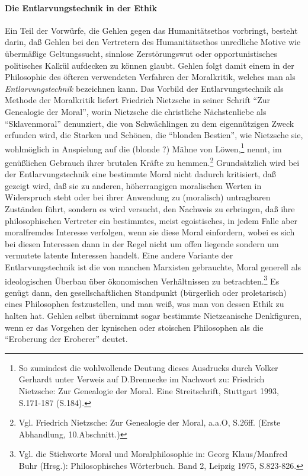 \documentclass[12pt,a4paper]{article}
\begin{document}
\paragraph{Die Entlarvungstechnik in der Ethik} Ein Teil der Vorwürfe, die
Gehlen gegen das Humanitätsethos vorbringt, besteht darin, daß Gehlen bei den
Vertretern des Humanitätsethos unredliche Motive wie übermäßige Geltungssucht,
sinnlose Zerstörungswut oder opportunistisches politisches Kalkül aufdecken zu
können glaubt. Gehlen folgt damit einem in der Philosophie des öfteren
verwendeten Verfahren der Moralkritik, welches man als {\em
  Entlarvungstechnik} bezeichnen kann. Das Vorbild der Entlarvungstechnik als
Methode der Moralkritik liefert Friedrich Nietzsche in seiner Schrift "`Zur
Genealogie der Moral"', worin Nietzsche die christliche Nächstenliebe als
"`Sklavenmoral"' denunziert, die von Schwächlingen zu dem eigennützigen Zweck
erfunden wird, die Starken und Schönen, die "`blonden Bestien"', wie Nietzsche
sie, wohlmöglich in Anspielung auf die (blonde ?) Mähne von Löwen,\footnote{So
  zumindest die wohlwollende Deutung dieses Ausdrucks durch Volker Gerhardt
  unter Verweis auf D.Brennecke im Nachwort zu: Friedrich Nietzsche: Zur
  Genealogie der Moral. Eine Streitschrift, Stuttgart 1993, S.171-187
  (S.184).} nennt, im genüßlichen Gebrauch ihrer brutalen Kräfte zu
hemmen.\footnote{Vgl. Friedrich Nietzsche: Zur Genealogie der Moral, a.a.O,
  S.26ff. (Erste Abhandlung, 10.Abschnitt.)}  Grundsätzlich wird bei der
Entlarvungstechnik eine bestimmte Moral nicht dadurch kritisiert, daß gezeigt
wird, daß sie zu anderen, höherrangigen moralischen Werten in Widerspruch
steht oder bei ihrer Anwendung zu (moralisch) untragbaren Zuständen führt,
sondern es wird versucht, den Nachweis zu erbringen, daß ihre philosophischen
Vertreter ein bestimmtes, meist egoistisches, in jedem Falle aber moralfremdes
Interesse verfolgen, wenn sie diese Moral einfordern, wobei es sich bei diesen
Interessen dann in der Regel nicht um offen liegende sondern um vermutete
latente Interessen handelt. Eine andere Variante der Entlarvungstechnik ist
die von manchen Marxisten gebrauchte, Moral generell als ideologischen Überbau
über ökonomischen Verhältnissen zu betrachten.\footnote{Vgl. die Stichworte
  Moral und Moralphilosophie in: Georg Klaus/Manfred Buhr (Hrsg.):
  Philosophisches Wörterbuch. Band 2, Leipzig 1975, S.823-826.} Es genügt
dann, den gesellschaftlichen Standpunkt (bürgerlich oder proletarisch) eines
Philosophen festzustellen, und man weiß, was man von dessen Ethik zu halten
hat. Gehlen selbst übernimmt sogar bestimmte Nietzeanische Denkfiguren, wenn
er das Vorgehen der kynischen oder stoischen Philosophen als die "`Eroberung
der Eroberer"' deutet.
\end{document}
